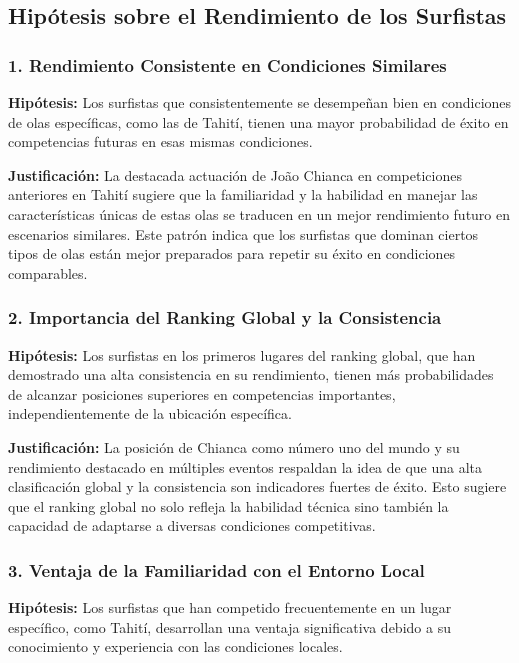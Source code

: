 \documentclass[12pt]{article}
\begin{document}
\subsection*{Hipótesis sobre el Rendimiento de los Surfistas}

\subsubsection*{1. Rendimiento Consistente en Condiciones Similares}

\textbf{Hipótesis:} Los surfistas que consistentemente se desempeñan bien en condiciones de olas específicas, como las de Tahití, tienen una mayor probabilidad de éxito en competencias futuras en esas mismas condiciones.

\textbf{Justificación:} La destacada actuación de João Chianca en competiciones anteriores en Tahití sugiere que la familiaridad y la habilidad en manejar las características únicas de estas olas se traducen en un mejor rendimiento futuro en escenarios similares. Este patrón indica que los surfistas que dominan ciertos tipos de olas están mejor preparados para repetir su éxito en condiciones comparables.

\subsubsection*{2. Importancia del Ranking Global y la Consistencia}

\textbf{Hipótesis:} Los surfistas en los primeros lugares del ranking global, que han demostrado una alta consistencia en su rendimiento, tienen más probabilidades de alcanzar posiciones superiores en competencias importantes, independientemente de la ubicación específica.

\textbf{Justificación:} La posición de Chianca como número uno del mundo y su rendimiento destacado en múltiples eventos respaldan la idea de que una alta clasificación global y la consistencia son indicadores fuertes de éxito. Esto sugiere que el ranking global no solo refleja la habilidad técnica sino también la capacidad de adaptarse a diversas condiciones competitivas.

\subsubsection*{3. Ventaja de la Familiaridad con el Entorno Local}

\textbf{Hipótesis:} Los surfistas que han competido frecuentemente en un lugar específico, como Tahití, desarrollan una ventaja significativa debido a su conocimiento y experiencia con las condiciones locales.
\end{document}
